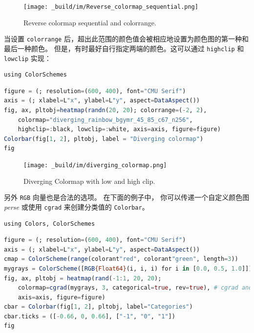 \documentclass[
  notoc %
]{tufte-book}
\newcommand{\passthrough}[1]{#1}
\begin{document}
\begin{figure}
\hypertarget{fig:Reverse_colormap_sequential}{%
\centering
\texttt{[image: \_build/im/Reverse\_colormap\_sequential.png]}
\caption{Reverse colormap sequential and
colorrange.}\label{fig:Reverse_colormap_sequential}
}
\end{figure}

当设置 \passthrough{\lstinline!colorrange!}
后，超出此范围的颜色值会被相应地设置为颜色图的第一种和最后一种颜色。
但是，有时最好自行指定两端的颜色。这可以通过
\passthrough{\lstinline!highclip!} 和 \passthrough{\lstinline!lowclip!}
实现：

\begin{lstlisting}
using ColorSchemes
\end{lstlisting}

\begin{lstlisting}[language=Julia]
figure = (; resolution=(600, 400), font="CMU Serif")
axis = (; xlabel=L"x", ylabel=L"y", aspect=DataAspect())
fig, ax, pltobj=heatmap(randn(20, 20); colorrange=(-2, 2),
    colormap="diverging_rainbow_bgymr_45_85_c67_n256",
    highclip=:black, lowclip=:white, axis=axis, figure=figure)
Colorbar(fig[1, 2], pltobj, label = "Diverging colormap")
fig
\end{lstlisting}

\begin{figure}
\hypertarget{fig:diverging_colormap}{%
\centering
\texttt{[image: \_build/im/diverging\_colormap.png]}
\caption{Diverging Colormap with low and high
clip.}\label{fig:diverging_colormap}
}
\end{figure}

另外 \passthrough{\lstinline!RGB!} 向量也是合法的选项。 在下面的例子中，
你可以传递一个自定义颜色图 \emph{perse} 或使用
\passthrough{\lstinline!cgrad!} 来创建分类值的
\passthrough{\lstinline!Colorbar!}。

\begin{lstlisting}
using Colors, ColorSchemes
\end{lstlisting}

\begin{lstlisting}[language=Julia]
figure = (; resolution=(600, 400), font="CMU Serif")
axis = (; xlabel=L"x", ylabel=L"y", aspect=DataAspect())
cmap = ColorScheme(range(colorant"red", colorant"green", length=3))
mygrays = ColorScheme([RGB{Float64}(i, i, i) for i in [0.0, 0.5, 1.0]])
fig, ax, pltobj = heatmap(rand(-1:1, 20, 20);
    colormap=cgrad(mygrays, 3, categorical=true, rev=true), # cgrad and Symbol, mygrays,
    axis=axis, figure=figure)
cbar = Colorbar(fig[1, 2], pltobj, label="Categories")
cbar.ticks = ([-0.66, 0, 0.66], ["-1", "0", "1"])
fig
\end{lstlisting}
\end{document}
